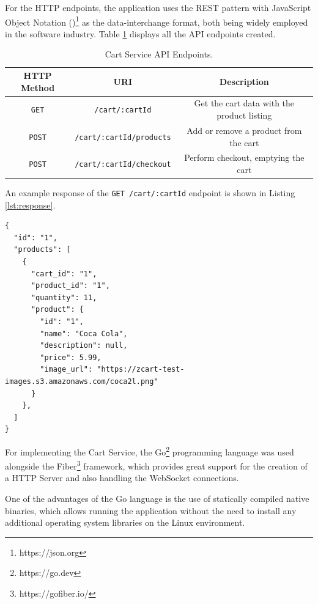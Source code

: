 \documentclass[openright]{normas-utf-tex} %
\begin{document}
For the HTTP endpoints, the application uses the REST \cite{Roy2000} pattern
with JavaScript Object Notation ()\footnote{https://json.org} as the data-interchange format, both
being widely employed in the software industry. Table \ref{tab:cartendpoints} displays all the API
endpoints created.

\begin{table}[H]
	\centering
	\begin{tabular}{c | c|c}
		\hline 
        HTTP Method & URI & Description \\
		\hline
        \texttt{GET} & \texttt{/cart/:cartId} & Get the cart data with the product listing \\
        \texttt{POST} & \texttt{/cart/:cartId/products} & Add or remove a product from the cart \\
        \texttt{POST} & \texttt{/cart/:cartId/checkout} & Perform checkout, emptying the cart \\
		\hline 
	\end{tabular}
    \caption[Cart Service API endpoints]{Cart Service API Endpoints.}
    \label{tab:cartendpoints}
\end{table}

An example response of the \texttt{GET /cart/:cartId} endpoint is shown in
Listing \ref{lst:response}.

\begin{lstlisting}[caption={Example response for the \texttt{GET /cart/:cartId} endpoint using JSON},label={lst:response}]
{
  "id": "1",
  "products": [
    {
      "cart_id": "1",
      "product_id": "1",
      "quantity": 11,
      "product": {
        "id": "1",
        "name": "Coca Cola",
        "description": null,
        "price": 5.99,
        "image_url": "https://zcart-test-images.s3.amazonaws.com/coca2l.png"
      }
    },
  ]
}
\end{lstlisting}

For implementing the Cart Service, the Go\footnote{https://go.dev} programming
language was used alongside the Fiber\footnote{https://gofiber.io/} framework,
which provides great support for the creation of a HTTP Server and also
handling the WebSocket connections.

One of the advantages of the Go language is the use of statically compiled
native binaries, which allows running the application without the need to
install any additional operating system libraries on the Linux environment. 
\end{document}
